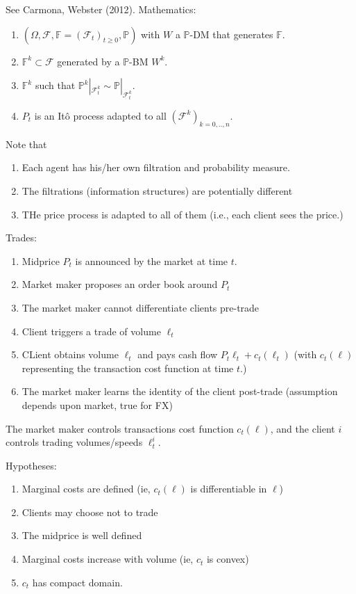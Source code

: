 See Carmona, Webster (2012). Mathematics:
\begin{enumerate}
	\item $(\Omega, \mathcal{F}, \mathbb{F}=(\mathcal{F}_t)_{t\geq 0}, \mathbb{P})$ with $W$ a $\mathbb{P}$-DM that generates $\mathbb{F}$.
	\item $\mathbb{F}^k \subset \mathcal{F}$ generated by a $\mathbb{P}$-BM $W^k$.
	\item $\mathbb{F}^k$ such that $\mathbb{P}^k|_{\mathcal{F}^k_t} \sim \mathbb{P}|_{\mathcal{F}^k_t}$.
	\item $P_t$ is an It\^o process adapted to all $(\mathcal{F}^k)_{k=0,..,n}$.
\end{enumerate}
Note that
\begin{enumerate}
	\item Each agent has his/her own filtration and probability measure.
	\item The filtrations (information structures) are potentially different
	\item THe price process is adapted to all of them (i.e., each client sees the price.)
\end{enumerate}

Trades:
\begin{enumerate}
	\item Midprice $P_t$ is announced by the market at time $t$.
	\item Market maker proposes an order book around $P_t$
	\item The market maker cannot differentiate clients pre-trade
	\item Client triggers a trade of volume $\ell_t$
	\item CLient obtains volume $\ell_t$ and pays cash flow $P_t\ell_t + c_t(\ell_t)$ (with $c_t(\ell)$ representing the transaction cost function at time $t$.)
	\item The market maker learns the identity of the client post-trade (assumption depends upon market, true for FX)
\end{enumerate}


The market maker controls transactions cost function $c_t(\ell)$, and the client $i$ controls trading volumes/speeds $\ell_t^i$.

Hypotheses:
\begin{enumerate}
	\item Marginal costs are defined (ie, $c_t(\ell)$ is differentiable in $\ell$)
	\item Clients may choose not to trade
	\item The midprice is well defined
	\item Marginal costs increase with volume (ie, $c_t$ is convex)
	\item $c_t$ has compact domain.
\end{enumerate}

